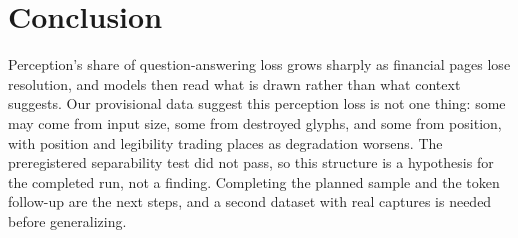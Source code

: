 \documentclass[11pt]{article}
\begin{document}
\section{Conclusion}

Perception's share of question-answering loss grows sharply as financial pages lose resolution, and models then read what is drawn rather than what context suggests. Our provisional data suggest this perception loss is not one thing: some may come from input size, some from destroyed glyphs, and some from position, with position and legibility trading places as degradation worsens. The preregistered separability test did not pass, so this structure is a hypothesis for the completed run, not a finding. Completing the planned sample and the token follow-up are the next steps, and a second dataset with real captures is needed before generalizing.


\end{document}

